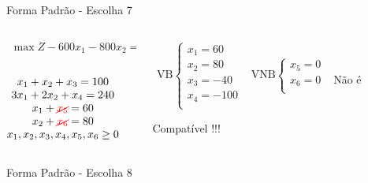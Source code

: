 \begin{frame}
{\begin{block}{Forma Padrão - {\color{cyan}Escolha 7}}
			\begin{columns}
				\begin{column}{0.35\textwidth}
					$
						\begin{matrix}
							\max Z - 600x_1 - 800x_2 = 0 \\
						\end{matrix}
					$ \\
					 \\
					$
						\begin{matrix}
							x_1  + x_2  + x_3                   = 100 \\
							3x_1 + 2x_2       + x_4             = 240 \\
							x_1                     + {\color{red}\cancel{x_5}}       = 60 \\
							x_2                           + {\color{red}\cancel{x_6}} = 80 \\
							x_1,x_2, x_3, x_4, x_5, x_6 \ge 0 \\
						\end{matrix}
					$
				\end{column}
				\vline
				\hspace{0.1cm}
				\begin{column}{0.45\textwidth}
						$
							\begin{matrix}
								\text{VB} \left\{  \begin{matrix}
																 x_1 = 60 \\
																 x_2 = 80 \\
																 x_3 = -40 \\
																 x_4 = -100 \\
												   \end{matrix} 
										   \right.
								&
								\text{VNB} \left\{  \begin{matrix}
																 x_5 = 0 \\
																 x_6 = 0 \\
												   \end{matrix} 
										   \right. 
								\\
							 & \\
							\end{matrix}
						$
						{\color{red}Não é Compatível !!!}
				\end{column}
			\end{columns}
		\end{block}
	}
	{
		\begin{block}{Forma Padrão - {\color{cyan}Escolha 8}}

\end{block}}
\end{frame}
